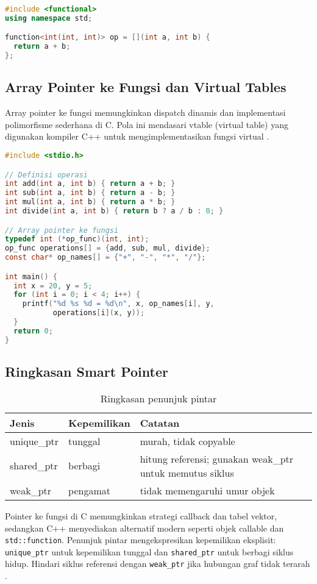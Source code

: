 \documentclass[../main.tex]{subfiles}
\begin{document}
\begin{lstlisting}[language=C++, caption={std::function dan lambda di C++}]
#include <functional>
using namespace std;

function<int(int, int)> op = [](int a, int b) {
  return a + b;
};
\end{lstlisting}

\subsection{Array Pointer ke Fungsi dan Virtual Tables}
Array pointer ke fungsi memungkinkan dispatch dinamis dan implementasi polimorfisme sederhana di C. Pola ini mendasari vtable (virtual table) yang digunakan kompiler C++ untuk mengimplementasikan fungsi virtual \parencite{gnu-c-manual,cpp-reference}.

\begin{lstlisting}[language=C, caption={Array pointer fungsi untuk dispatch}]
#include <stdio.h>

// Definisi operasi
int add(int a, int b) { return a + b; }
int sub(int a, int b) { return a - b; }
int mul(int a, int b) { return a * b; }
int divide(int a, int b) { return b ? a / b : 0; }

// Array pointer ke fungsi
typedef int (*op_func)(int, int);
op_func operations[] = {add, sub, mul, divide};
const char* op_names[] = {"+", "-", "*", "/"};

int main() {
  int x = 20, y = 5;
  for (int i = 0; i < 4; i++) {
    printf("%d %s %d = %d\n", x, op_names[i], y, 
           operations[i](x, y));
  }
  return 0;
}
\end{lstlisting}

\subsection{Ringkasan Smart Pointer}
\begin{table}[H]
  \centering
  \caption{Ringkasan penunjuk pintar}
  \begin{tabular}{@{}lll@{}}
    \toprule
    Jenis & Kepemilikan & Catatan \\
    \midrule
    unique\_ptr & tunggal & murah, tidak copyable \\
    shared\_ptr & berbagi & hitung referensi; gunakan weak\_ptr untuk memutus siklus \\
    weak\_ptr & pengamat & tidak memengaruhi umur objek \\
    \bottomrule
  \end{tabular}
\end{table}
Pointer ke fungsi di C memungkinkan strategi callback dan tabel vektor, sedangkan C++ menyediakan alternatif modern seperti objek callable dan \texttt{std::function}. Penunjuk pintar mengekspresikan kepemilikan eksplisit: \texttt{unique\_ptr} untuk kepemilikan tunggal dan \texttt{shared\_ptr} untuk berbagi siklus hidup. Hindari siklus referensi dengan \texttt{weak\_ptr} jika hubungan graf tidak terarah \parencite{cpp-reference}.
\end{document}

